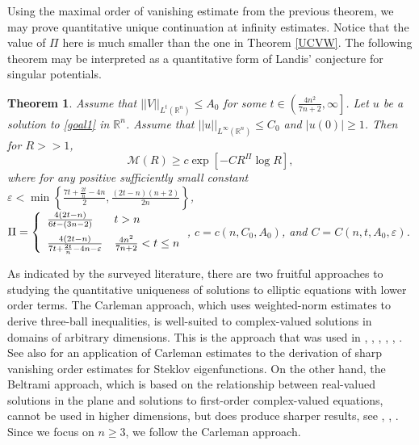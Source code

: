 \documentclass[11pt]{amsart}
\theoremstyle{plain}
\newtheorem{theorem}{Theorem}
\numberwithin{equation}{section}
\begin{document}
Using the maximal order of vanishing estimate from the previous theorem, we may prove quantitative unique continuation at infinity estimates.
Notice that the value of $\Pi$ here is much smaller than the one in Theorem \ref{UCVW}.
The following theorem may be interpreted as a quantitative form of Landis' conjecture for singular potentials.

\begin{theorem}
Assume that ${\left\vert\left\vert {V}\right\vert\right\vert}_{L^t{\left( {{\ensuremath{\mathbb{R}}}^n} \right) }} \le A_0$ for some $t \in {\left( { \frac{4 n^2}{7n+2}, {\infty}} \right] }$.
Let $u$ be a solution to \eqref{goal1} in ${\ensuremath{\mathbb{R}}}^n$.
Assume that ${\left\vert\left\vert {u}\right\vert\right\vert}_{L^{\infty}{\left( {{\ensuremath{\mathbb{R}}}^n} \right) }} \le C_0$ and ${\left\vert{u{\left( {0} \right) }}\right\vert} \ge 1$.
Then for $R >> 1$,
\begin{equation*}
\mathcal{M}{\left( {R} \right) } \ge c \exp{\left[{-C R^\Pi \log R}\right]},
\end{equation*}
where for any positive sufficiently small constant ${\varepsilon} <
\min{\left\{{\frac{7t+\frac{2t}n-4n}{2}, \frac{(2t-n)(n+2)}{2n} }\right\}}$, \\
${\displaystyle} \Pi =  \left\{\begin{array}{ll}
\frac{4{\left( {2t-n} \right) }}{6t - {\left( {3n-2} \right) }} & t > n \medskip \\
\frac{4{\left( {2t-n} \right) }} {7t+\frac{2t}n-4n-{\varepsilon}} & \frac{4n^2}{7n+2} < t \le n
\end{array}\right.$,
$c = c{\left( {n, C_0, A_0} \right) }$, and $C = C{\left( {n, t, A_0, {\varepsilon}} \right) }$.
\label{UCV}
\end{theorem}

As indicated by the surveyed literature, there are two fruitful
approaches to studying the quantitative uniqueness of solutions to
elliptic equations with lower order terms. The Carleman approach,
which uses weighted-norm estimates to derive three-ball
inequalities, is well-suited to complex-valued solutions in domains
of arbitrary dimensions. This is the approach that was used in
\cite{DF88}, \cite{DF90}, \cite{BK05}, \cite{Ken07}, \cite{Dav14},
\cite{LW14}. See also \cite{Zhu15} for an application of Carleman
estimates to the derivation of sharp vanishing order estimates for Steklov
eigenfunctions. On the other hand, the Beltrami approach, which is
based on the relationship between real-valued solutions in the plane
and solutions to first-order complex-valued equations, cannot be
used in higher dimensions, but does produce sharper results, see
\cite{KSW15}, \cite{KW15}, \cite{DKW16}. Since we focus on $n \ge
3$, we follow the Carleman approach.
\end{document}
